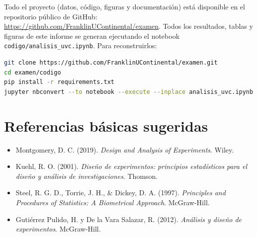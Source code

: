 \documentclass[12pt,a4paper]{article}
\begin{document}
Todo el proyecto (datos, código, figuras y documentación) está disponible en el repositorio público de GitHub: \url{https://github.com/FranklinUContinental/examen}. Todos los resultados, tablas y figuras de este informe se generan ejecutando el notebook \texttt{codigo/analisis\_uvc.ipynb}. Para reconstruirlos:

\begin{lstlisting}[language=bash,caption={Clonado y reconstrucción del análisis.}]
git clone https://github.com/FranklinUContinental/examen.git
cd examen/codigo
pip install -r requirements.txt
jupyter nbconvert --to notebook --execute --inplace analisis_uvc.ipynb
\end{lstlisting}

\section*{Referencias básicas sugeridas}

\begin{itemize}
    \item Montgomery, D. C. (2019). \textit{Design and Analysis of Experiments}. Wiley.
    \item Kuehl, R. O. (2001). \textit{Diseño de experimentos: principios estadísticos para el diseño y análisis de investigaciones}. Thomson.
    \item Steel, R. G. D., Torrie, J. H., \& Dickey, D. A. (1997). \textit{Principles and Procedures of Statistics: A Biometrical Approach}. McGraw-Hill.
    \item Gutiérrez Pulido, H. y De la Vara Salazar, R. (2012). \textit{Análisis y diseño de experimentos}. McGraw-Hill.
\end{itemize}
\end{document}
